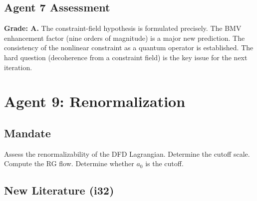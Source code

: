 \documentclass[11pt,a4paper]{article}
\begin{document}
\subsection{Agent 7 Assessment}

\textbf{Grade: A.} The constraint-field hypothesis is formulated precisely. The BMV enhancement factor (nine orders of magnitude) is a major new prediction. The consistency of the nonlinear constraint as a quantum operator is established. The hard question (decoherence from a constraint field) is the key issue for the next iteration.


\newpage
\section{Agent 9: Renormalization}
\label{sec:agent9}

\subsection{Mandate}

Assess the renormalizability of the DFD Lagrangian. Determine the cutoff scale. Compute the RG flow. Determine whether $a_0$ is the cutoff.

\subsection{New Literature (i32)}
\end{document}
